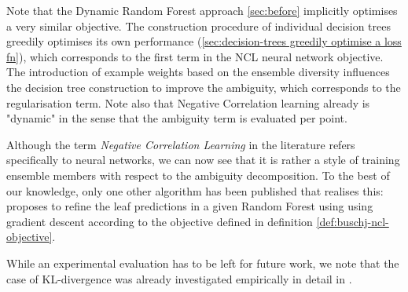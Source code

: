 \documentclass[../main.tex]{subfiles}
\begin{document}
Note that the Dynamic Random Forest approach \ref{sec:before} implicitly optimises a very similar objective. The construction procedure of individual decision trees greedily optimises its own performance (\ref{sec:decision-trees greedily optimise a loss fn}), which corresponds to the first term in the NCL neural network objective. The introduction of example weights based on the ensemble diversity influences the decision tree construction to improve the ambiguity, which corresponds to the regularisation term. Note also that Negative Correlation learning already is "dynamic" in the sense that the ambiguity term is evaluated per point. 

Although the term \textit{Negative Correlation Learning} in the literature refers specifically to neural networks, we can now see that it is rather a style of training ensemble members with respect to the ambiguity decomposition.
To the best of our knowledge, only one other algorithm has been published that realises this: \cite{negative-correlation-forests} proposes to refine the leaf predictions in a given Random Forest using using gradient descent according to the objective defined in definition \ref{def:buschj-ncl-objective}.


While an experimental evaluation has to be left for future work, we note that the case of KL-divergence was already investigated empirically in detail in \cite{webb_EnsembleNotEnsemble_2019}.





\end{document}
